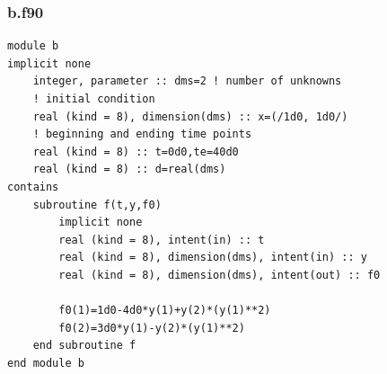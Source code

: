 \documentclass[a4paper,oneside]{book}
\numberwithin{equation}{chapter}
\begin{document}
\subsubsection{b.f90}
\begin{lstlisting}
module b  
implicit none 
	integer, parameter :: dms=2 ! number of unknowns
    ! initial condition
	real (kind = 8), dimension(dms) :: x=(/1d0, 1d0/) 
    ! beginning and ending time points
	real (kind = 8) :: t=0d0,te=40d0 
	real (kind = 8) :: d=real(dms)
contains      
	subroutine f(t,y,f0)
		implicit none
		real (kind = 8), intent(in) :: t
		real (kind = 8), dimension(dms), intent(in) :: y
		real (kind = 8), dimension(dms), intent(out) :: f0
		
		f0(1)=1d0-4d0*y(1)+y(2)*(y(1)**2)
		f0(2)=3d0*y(1)-y(2)*(y(1)**2)
	end subroutine f
end module b 
\end{lstlisting}
\end{document}
